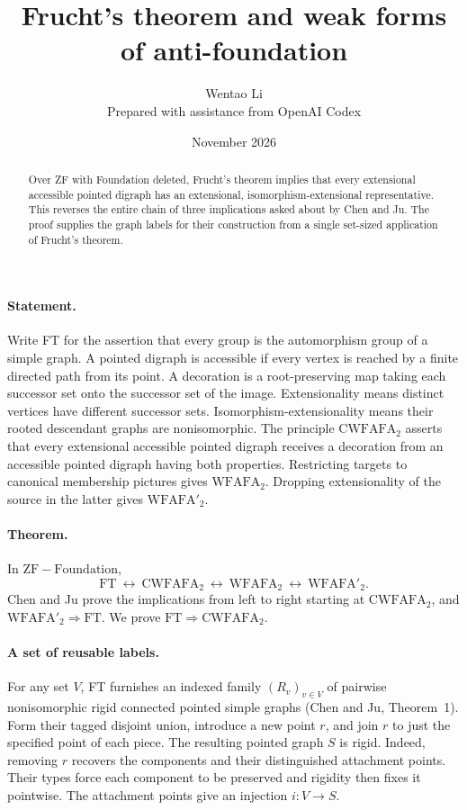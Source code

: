 \documentclass[11pt]{article}
\title{Frucht's theorem and weak forms of anti-foundation}
\author{Wentao Li\\[2pt]\small Prepared with assistance from OpenAI Codex}
\date{November 2026}
\begin{document}
\maketitle
\begin{abstract}
Over ZF with Foundation deleted, Frucht's theorem implies that every extensional accessible pointed digraph has an extensional, isomorphism-extensional representative. This reverses the entire chain of three implications asked about by Chen and Ju. The proof supplies the graph labels for their construction from a single set-sized application of Frucht's theorem.
\end{abstract}

\paragraph{Statement.} Write FT for the assertion that every group is the automorphism group of a simple graph. A pointed digraph is accessible if every vertex is reached by a finite directed path from its point. A decoration is a root-preserving map taking each successor set onto the successor set of the image. Extensionality means distinct vertices have different successor sets. Isomorphism-extensionality means their rooted descendant graphs are nonisomorphic. The principle $\mathrm{CWFAFA}_2$ asserts that every extensional accessible pointed digraph receives a decoration from an accessible pointed digraph having both properties. Restricting targets to canonical membership pictures gives $\mathrm{WFAFA}_2$. Dropping extensionality of the source in the latter gives $\mathrm{WFAFA}'_2$.

\paragraph{Theorem.} In $\mathrm{ZF}-\mathrm{Foundation}$,
\[
 \mathrm{FT}\ \longleftrightarrow\ \mathrm{CWFAFA}_2\ \longleftrightarrow\
 \mathrm{WFAFA}_2\ \longleftrightarrow\ \mathrm{WFAFA}'_2 .
\]
Chen and Ju prove the implications from left to right starting at $\mathrm{CWFAFA}_2$, and $\mathrm{WFAFA}'_2\Rightarrow\mathrm{FT}$. We prove $\mathrm{FT}\Rightarrow\mathrm{CWFAFA}_2$.

\paragraph{A set of reusable labels.} For any set $V$, FT furnishes an indexed family $(R_v)_{v\in V}$ of pairwise nonisomorphic rigid connected pointed simple graphs (Chen and Ju, Theorem~1). Form their tagged disjoint union, introduce a new point $r$, and join $r$ to just the specified point of each piece. The resulting pointed graph $S$ is rigid. Indeed, removing $r$ recovers the components and their distinguished attachment points. Their types force each component to be preserved and rigidity then fixes it pointwise. The attachment points give an injection $i:V\to S$.
\end{document}

